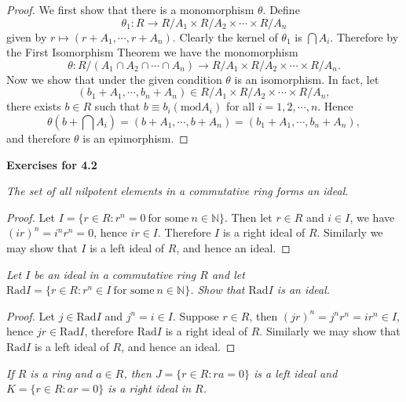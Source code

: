 \begin{proof}
We first show that there is a monomorphism $\theta$. Define 
$$
\theta _1:R\rightarrow R/A_1\times R/A_2\times \cdots \times R/A_n
$$
given by $r\mapsto(r+A_1,\cdots,r+A_n)$. Clearly the kernel of $\theta_1$ is $\bigcap A_i$. Therefore by the First Isomorphism Theorem we have the monomorphism 
$$
\theta :R/\left( A_1\cap A_2\cap \cdots \cap A_n \right) \rightarrow R/A_1\times R/A_2\times \cdots \times R/A_n.
$$
Now we show that under the given condition $\theta$ is an isomorphism. In fact, let 
$$
\left( b_1+A_1,\cdots ,b_n+A_n \right) \in R/A_1\times R/A_2\times \cdots \times R/A_n,
$$
there exists $b\in R$ such that $b\equiv b_i(\mathrm{mod}A_i)$ for all $i=1,2,\cdots,n$. Hence 
$$
\theta \left( b+\bigcap{A_i} \right) =\left( b+A_1,\cdots ,b+A_n \right) =\left( b_1+A_1,\cdots ,b_n+A_n \right) ,
$$
and therefore $\theta$ is an epimorphism.
\end{proof}
\begin{center}
\begin{large}
    \textbf{Exercises for 4.2}
\end{large}
\end{center}
\begin{problem}\em
The set of all nilpotent elements in a commutative ring forms an ideal.
\end{problem}
\begin{proof}
Let $I=\{r\in R:r^n=0\ \text{for some}\ n\in\mathbb{N}\}$. Then let $r\in R$ and $i\in I$, we have $(ir)^n=i^nr^n=0$, hence $ir\in I$. Therefore $I$ is a right ideal of $R$. Similarly we may show that $I$ is a left ideal of $R$, and hence an ideal.
\end{proof}
\begin{problem}\em
Let $I$ be an ideal in a commutative ring $R$ and let $\mathrm{Rad}I=\{r\in R:r^n\in I\ \text{for some}\ n\in\mathbb{N}\}$. Show that $\mathrm{Rad}I$ is an ideal.
\end{problem}
\begin{proof}
Let $j\in\mathrm{Rad}I$ and $j^n=i\in I$. Suppose $r\in R$, then $(jr)^n=j^nr^n=ir^n\in I$, hence $jr\in\mathrm{Rad}I$, therefore $\mathrm{Rad}I$ is a right ideal of $R$. Similarly we may show that $\mathrm{Rad}I$ is a left ideal of $R$, and hence an ideal.
\end{proof}
\begin{problem}\em
If $R$ is a ring and $a\in R$, then $J=\{r\in R:ra=0\}$ is a left ideal and $K=\{r\in R:ar=0\}$ is a right ideal in $R$.
\end{problem}
